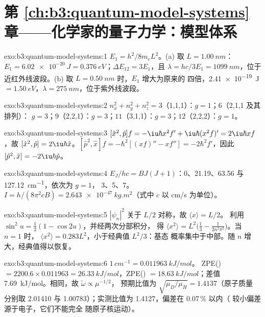 \section*{第 \ref{ch:b3:quantum-model-systems} 章——化学家的量子力学：模型体系}

\begin{solution}{exo:b3:quantum-model-systems:1}
$E_1 = h^2/8m_eL^2$。(a) 取 $L = \qty{1.00}{nm}$：$E_1 = \qty{6.02e-20}{J} =
\qty{0.376}{eV}$；$\Delta E_{12} = 3E_1$，且 $\lambda = hc/3E_1 =
\qty{1099}{nm}$，位于近红外线波段。(b) 取 $L = \qty{0.50}{nm}$ 时，$E_1$ 增大为原来的
四倍，\qty{2.41e-19}{J} $= \qty{1.50}{eV}$，$\lambda =
\qty{275}{nm}$，位于紫外线波段。
\end{solution}

\begin{solution}{exo:b3:quantum-model-systems:2}
$n_x^2 + n_y^2 + n_z^2 = 3$（1,1,1）：$g = 1$；$6$（2,1,1 及其排列）：
$g = 3$；$9$（2,2,1）：$g = 3$；$11$（3,1,1）：$g = 3$；$12$（2,2,2）：$g = 1$。
\end{solution}

\begin{solution}{exo:b3:quantum-model-systems:3}
$[\hat x^2,\hat p]f = -\iu\hbar x^2f' + \iu\hbar(x^2f)' = 2\iu\hbar xf$，故
$[\hat x^2,\hat p] = 2\iu\hbar\hat x$。$[\hat p^2,\hat x]f = -\hbar^2[(xf)'' -
xf''] = -2\hbar^2f'$，因此 $[\hat p^2,\hat x] = -2\iu\hbar\hat p$。
\end{solution}

\begin{solution}{exo:b3:quantum-model-systems:4}
$E_J/hc = BJ(J+1)$：0、21.19、63.56 与 \qty{127.12}{cm^{-1}}，依次为 $g = 1$，
3、5、7。$I = h/(8\pi^2cB) = \qty{2.643e-47}{kg.m^2}$（式中 $c$ 以
\unit{cm/s} 为单位）。
\end{solution}

\begin{solution}{exo:b3:quantum-model-systems:5}
$|\psi_n|^2$ 关于 $L/2$ 对称，故 $\langle x\rangle = L/2$。
利用 $\sin^2u = \frac12(1 - \cos2u)$，并经两次分部积分，
得 $\langle x^2\rangle = L^2\big(\frac13 - \frac{1}{2n^2\pi^2}\big)$。当 $n = 1$ 时，
$\langle x^2\rangle = 0.283L^2$，小于经典值 $L^2/3$：基态
概率集中于中部。随 $n$ 增大，经典值得以恢复。
\end{solution}

\begin{solution}{exo:b3:quantum-model-systems:6}
$1\,\unit{cm^{-1}} = \qty{0.011963}{kJ/mol}$。 ZPE() $= 2200.6 \times
0.011963 = \qty{26.33}{kJ/mol}$，ZPE() $= \qty{18.63}{kJ/mol}$；差值
\qty{7.69}{kJ/mol}。相同，故 $\tilde\omega \propto \mu^{-1/2}$，
预期比值为 $\sqrt{\mu_D/\mu_H} = 1.4137$（原子质量
分别取 2.01410 与 1.00783）；实测比值为 1.4127，偏差在 0.07\,\% 以内（
较小偏差源于电子，它们不能完全
随原子核运动）。
\end{solution}

